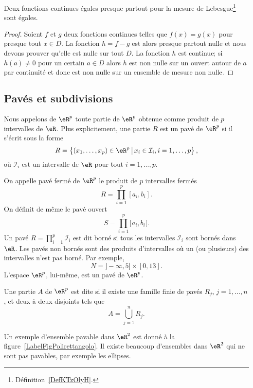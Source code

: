 \begin{proposition}     \label{PropNCMToWI}
	Deux fonctions continues égales presque partout pour la mesure de Lebesgue\footnote{Définition~\ref{DefKTzOlyH}.} sont égales.
\end{proposition}

\begin{proof}
	Soient \( f\) et \( g\) deux fonctions continues telles que \( f(x)=g(x)\) pour presque tout \( x\in D\). La fonction \( h=f-g\) est alors presque partout nulle et nous devons prouver qu'elle est nulle sur tout \( D\). La fonction \( h\) est continue; si \( h(a)\neq 0\) pour un certain \( a\in D\) alors \( h\) est non nulle sur un ouvert autour de \( a\) par continuité et donc est non nulle sur un ensemble de mesure non nulle.
\end{proof}

\subsection{Pavés et subdivisions}

\begin{definition}
	Nous appelons  de \( \eR^p\) toute partie de \( \eR^p\) obtenue comme produit de \( p\) intervalles de \( \eR\). Plus explicitement, une partie \( R\) est un pavé de \( \eR^p\) si il s'écrit sous la forme
	\[
		R=\left\{(x_1,\ldots, x_p)\in\eR^p \,\big\vert\,x_i\in \mathcal{I}_i,  i=1,\ldots, p  \right\},
	\]
	où \( \mathcal{I}_i\) est un intervalle de \( \eR\) pour tout \( i=1,\ldots, p\).
\end{definition}
On appelle pavé fermé de \( \eR^p\) le produit de \( p\) intervalles fermés
\[
	R=\prod_{i=1}^{p}[a_i,b_i].
\]
On définit de même le pavé ouvert
\[
	S=\prod_{i=1}^{p}]a_i,b_i[.
\]
Un pavé \(  R=\prod_{i=1}^{p}\mathcal{I}_i\) est dit borné si tous les intervalles \( \mathcal{I}_i\) sont bornés dans \( \eR\). Les pavés non bornés sont des produits d'intervalles où un (ou plusieurs) des intervalles n'est pas borné. Par exemple,
\[
	N=]-\infty, 5]\times [0,13].
\]
L'espace \( \eR^p\), lui-même, est un pavé de \( \eR^p\).
\begin{definition}
	Une partie \( A\) de \( \eR^p\) est dite   si il existe une famille finie de pavés \( R_j\), \( j=1,\ldots, n\), et deux à deux disjoints tels que
	\[
		A=\bigcup_{j=1}^{n}R_j.
	\]
\end{definition}
Un exemple d'ensemble pavable dans \( \eR^2\) est donné à la figure~\ref{LabelFigPolirettangolo}. Il existe beaucoup d'ensembles dans \( \eR^2\) qui ne sont pas pavables, par exemple les ellipses.
\newcommand{\CaptionFigPolirettangolo}{Un ensemble pavable.}


